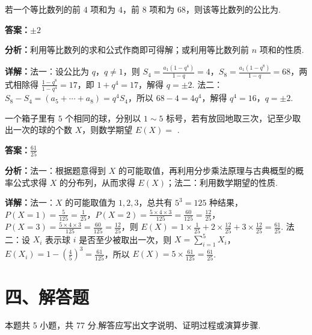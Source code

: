 \begin{question}[points=5]
若一个等比数列的前 $4$ 项和为 $4$，前 $8$ 项和为 $68$，则该等比数列的公比为.
\fillin[{$\pm 2$}]
\begin{solution}
\textbf{答案：}$\pm 2$

\textbf{分析：}利用等比数列的求和公式作商即可得解；或利用等比数列前 $n$ 项和的性质.

\textbf{详解：}法一：设公比为 $q$，$q \neq 1$，则 $S_4 = \frac{a_1(1-q^4)}{1-q} = 4$，$S_8 = \frac{a_1(1-q^8)}{1-q} = 68$，两式相除得 $\frac{1-q^8}{1-q^4}=17$，即 $1+q^4=17$，解得 $q = \pm 2$. 法二：$S_8 - S_4 = (a_5+\cdots+a_8) = q^4 S_4$，所以 $68-4 = 4q^4$，解得 $q^4=16$，$q = \pm 2$.
\end{solution}
\end{question}

\begin{question}[points=5]
一个箱子里有 $5$ 个相同的球，分别以 $1\sim5$ 标号，若有放回地取三次，记至少取出一次的球的个数 $X$，则数学期望 $E(X) =$ .
\fillin[{$\frac{61}{25}$}]
\begin{solution}
\textbf{答案：}$\frac{61}{25}$

\textbf{分析：}法一：根据题意得到 $X$ 的可能取值，再利用分步乘法原理与古典概型的概率公式求得 $X$ 的分布列，从而求得 $E(X)$；法二：利用数学期望的性质.

\textbf{详解：}法一：$X$ 的可能取值为 $1,2,3$，总共有 $5^3=125$ 种结果，$P(X=1)=\frac{5}{125}=\frac{1}{25}$，$P(X=2)=\frac{5\times4\times3}{125}=\frac{60}{125}=\frac{12}{25}$，$P(X=3)=\frac{5\times4\times3}{125}=\frac{60}{125}=\frac{12}{25}$，则 $E(X)=1\times\frac{1}{25}+2\times\frac{12}{25}+3\times\frac{12}{25}=\frac{61}{25}$. 法二：设 $X_i$ 表示球 $i$ 是否至少被取出一次，则 $X=\sum_{i=1}^5 X_i$，$E(X_i)=1-\left(\frac{4}{5}\right)^3 = \frac{61}{125}$，所以 $E(X)=5\times\frac{61}{125}=\frac{61}{25}$.
\end{solution}
\end{question}

\section*{四、解答题}
本题共 5 小题，共 77 分.解答应写出文字说明、证明过程或演算步骤.

